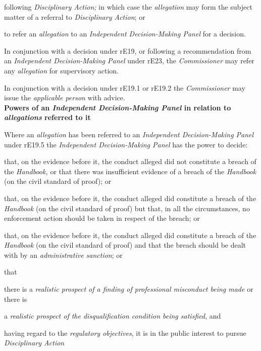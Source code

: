 following \emph{Disciplinary Action;}\la
in which case the \emph{allegation} may form the subject matter of a
referral to \emph{Disciplinary Action}; or\item to refer an \emph{allegation} to an \emph{Independent Decision-Making
Panel }for a decision.\ln
{}\par
In conjunction with a decision under rE19, or following a recommendation
from an \emph{Independent Decision-Making Panel} under
rE23, the \emph{Commissioner} may refer any \emph{allegation} for
supervisory action.\\
\par
In conjunction with a decision under rE19.1 or rE19.2
the \emph{Commissioner} may issue the \emph{applicable person} with
advice.\\
\textbf{Powers of an \emph{Independent Decision-Making Panel}\emph{ }in
relation to \emph{allegations} referred to it}\par
{}\par
Where an \emph{allegation} has been referred to an \emph{Independent
Decision-Making Panel }under rE19.5 the \emph{Independent
Decision-Making Panel }has the power to decide:\\\nl \item that, on the evidence before it, the conduct alleged did not
constitute a breach of the \emph{Handbook, }or that there was
insufficient evidence of a breach of the \emph{Handbook} (on the civil
standard of proof); or\item that, on the evidence before it, the conduct alleged did constitute a
breach of the \emph{Handbook} (on the civil standard of proof) but that,
in all the circumstances, no enforcement action should be taken in
respect of the breach; or\item that, on the evidence before it, the conduct alleged did constitute a
breach of the \emph{Handbook} (on the civil standard of proof) and that
the breach should be dealt with by an \emph{administrative sanction};
or\item that
\al \item there is a \emph{realistic prospect of a finding of professional
misconduct being made} or there is \item a \emph{realistic prospect of the
disqualification condition being satisfied}, and\item  having regard to the \emph{regulatory objectives}, it is in the
public interest to pursue \emph{Disciplinary Action}\la
